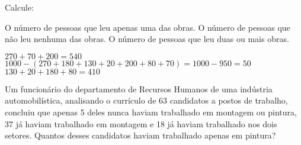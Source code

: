 \documentclass[a4paper,11pt,addpoints]{exam}
\begin{document}
\begin{questions}
Calcule:

\begin{tasks}
  \task O número de pessoas que leu apenas uma das obras.
  \task O número de pessoas que não leu nenhuma das obras.
  \task O número de pessoas que leu duas ou mais obras.
\end{tasks}

\begin{solution}[1in]
  \begin{center}
  \end{center}
  
  \begin{tasks}
    \task $270 + 70 + 200 = \boxed{540}$
    \task $1000 - (270+180+130+20+200+80+70) = 1000 - 950 = \boxed{50}$
    \task $130 + 20 + 180 + 80 = \boxed{410}$
  \end{tasks}
  
\end{solution}

\question[1]

Um funcionário do departamento de Recursos Humanos de uma indústria automobilística, analisando o currículo de 63 candidatos
a postos de trabalho, concluiu que apenas 5 deles nunca haviam trabalhado em montagem ou pintura, 37 já haviam trabalhado em 
montagem e 18 já haviam trabalhado nos dois setores. Quantos desses candidatos haviam trabalhado apenas em pintura?

\begin{solution}[2in]
  \begin{center}
\end{center}
\end{solution}
\end{questions}
\end{document}
